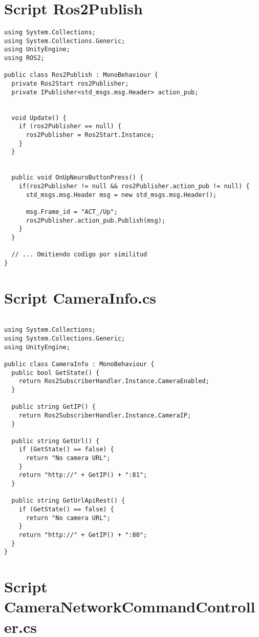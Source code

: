 \section{Script Ros2Publish}
\label{appendix:ros2publishscript}

\begin{lstlisting}[label={lst:Ros2PublishCode}, caption={Código de Ros2Publish}]
using System.Collections;
using System.Collections.Generic;
using UnityEngine;
using ROS2;

public class Ros2Publish : MonoBehaviour {
  private Ros2Start ros2Publisher;
  private IPublisher<std_msgs.msg.Header> action_pub;


  void Update() {
    if (ros2Publisher == null) {
      ros2Publisher = Ros2Start.Instance;
    }
  }


  public void OnUpNeuroButtonPress() {
    if(ros2Publisher != null && ros2Publisher.action_pub != null) {
      std_msgs.msg.Header msg = new std_msgs.msg.Header();
        
      msg.Frame_id = "ACT_/Up";
      ros2Publisher.action_pub.Publish(msg);
    }
  }

  // ... Omitiendo codigo por similitud
}
\end{lstlisting}

\section{Script CameraInfo.cs}
\label{appendix:camerainfoscript}

\begin{lstlisting}[label={lst:CameraInfoCode}, caption={Código de CameraInfo}]

using System.Collections;
using System.Collections.Generic;
using UnityEngine;

public class CameraInfo : MonoBehaviour {
  public bool GetState() {
    return Ros2SubscriberHandler.Instance.CameraEnabled;
  }

  public string GetIP() {
    return Ros2SubscriberHandler.Instance.CameraIP;
  }

  public string GetUrl() {
    if (GetState() == false) {
      return "No camera URL";
    }
    return "http://" + GetIP() + ":81";
  }

  public string GetUrlApiRest() {
    if (GetState() == false) {
      return "No camera URL";
    }
    return "http://" + GetIP() + ":80";
  }
}
\end{lstlisting}


\section{Script CameraNetworkCommandController.cs}
\label{appendix:CameraNetworkCommandController}

